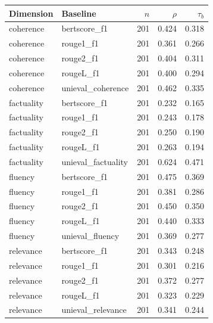 \begin{tabular}{llrrr}
\toprule
Dimension & Baseline & $n$ & $\rho$ & $\tau_b$ \\
\midrule
coherence & bertscore\_f1 & 201 & 0.424 & 0.318 \\
coherence & rouge1\_f1 & 201 & 0.361 & 0.266 \\
coherence & rouge2\_f1 & 201 & 0.404 & 0.311 \\
coherence & rougeL\_f1 & 201 & 0.400 & 0.294 \\
coherence & unieval\_coherence & 201 & 0.462 & 0.335 \\
factuality & bertscore\_f1 & 201 & 0.232 & 0.165 \\
factuality & rouge1\_f1 & 201 & 0.243 & 0.178 \\
factuality & rouge2\_f1 & 201 & 0.250 & 0.190 \\
factuality & rougeL\_f1 & 201 & 0.263 & 0.194 \\
factuality & unieval\_factuality & 201 & 0.624 & 0.471 \\
fluency & bertscore\_f1 & 201 & 0.475 & 0.369 \\
fluency & rouge1\_f1 & 201 & 0.381 & 0.286 \\
fluency & rouge2\_f1 & 201 & 0.450 & 0.350 \\
fluency & rougeL\_f1 & 201 & 0.440 & 0.333 \\
fluency & unieval\_fluency & 201 & 0.369 & 0.277 \\
relevance & bertscore\_f1 & 201 & 0.343 & 0.248 \\
relevance & rouge1\_f1 & 201 & 0.301 & 0.216 \\
relevance & rouge2\_f1 & 201 & 0.372 & 0.277 \\
relevance & rougeL\_f1 & 201 & 0.323 & 0.229 \\
relevance & unieval\_relevance & 201 & 0.341 & 0.244 \\
\bottomrule
\end{tabular}
